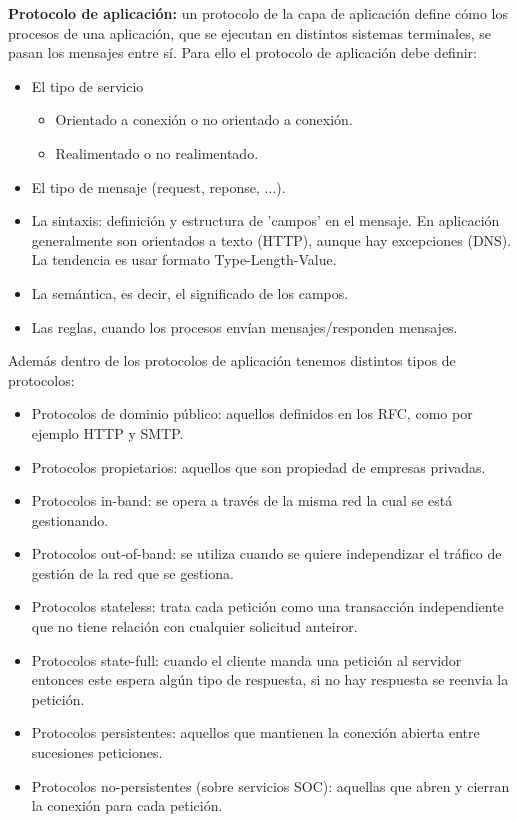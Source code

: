 \documentclass[a4paper,11pt]{article}
\begin{document}
\textbf{Protocolo de aplicación:} un protocolo de la capa de aplicación define cómo los procesos de una aplicación, que se ejecutan en distintos sistemas terminales, se pasan los mensajes entre sí. Para ello el protocolo de aplicación debe definir:

\begin{itemize}
\item El tipo de servicio
	\begin{itemize}
		\item Orientado a conexión o no orientado a conexión.
		\item Realimentado o no realimentado.
	\end{itemize}
\item El tipo de mensaje (request, reponse, $\ldots$).
\item La sintaxis: definición y estructura de 'campos' en el mensaje. En aplicación generalmente son orientados a texto (HTTP), aunque hay excepciones (DNS). La tendencia es usar formato Type-Length-Value.
\item La semántica, es decir, el significado de los campos.
\item Las reglas, cuando los procesos envían mensajes/responden mensajes.
\end{itemize}

Además dentro de los protocolos de aplicación tenemos distintos tipos de protocolos:
\begin{itemize}
\item Protocolos de dominio público: aquellos definidos en los RFC, como por ejemplo HTTP y SMTP.
\item Protocolos propietarios: aquellos que son propiedad de empresas privadas.
\item Protocolos in-band: se opera a través de la misma red la cual se está gestionando.
\item Protocolos out-of-band: se utiliza cuando se quiere independizar el tráfico de gestión de la red que se gestiona.
\item Protocolos stateless: trata cada petición como una transacción independiente que no tiene relación con cualquier solicitud anteiror.
\item Protocolos state-full: cuando el cliente manda una petición al servidor entonces este espera algún tipo de respuesta, si no hay respuesta se reenvia la petición.
\item Protocolos persistentes: aquellos que mantienen la conexión abierta entre sucesiones peticiones.
\item Protocolos no-persistentes (sobre servicios SOC): aquellas que abren y cierran la conexión para cada petición.
\end{itemize}
\end{document}
